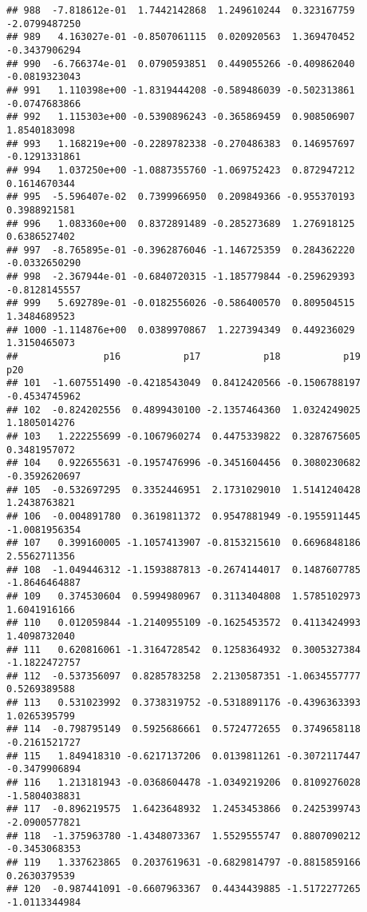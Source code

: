 \documentclass[
]{article}
\begin{document}
\begin{verbatim}
## 988  -7.818612e-01  1.7442142868  1.249610244  0.323167759 -2.0799487250
## 989   4.163027e-01 -0.8507061115  0.020920563  1.369470452 -0.3437906294
## 990  -6.766374e-01  0.0790593851  0.449055266 -0.409862040 -0.0819323043
## 991   1.110398e+00 -1.8319444208 -0.589486039 -0.502313861 -0.0747683866
## 992   1.115303e+00 -0.5390896243 -0.365869459  0.908506907  1.8540183098
## 993   1.168219e+00 -0.2289782338 -0.270486383  0.146957697 -0.1291331861
## 994   1.037250e+00 -1.0887355760 -1.069752423  0.872947212  0.1614670344
## 995  -5.596407e-02  0.7399966950  0.209849366 -0.955370193  0.3988921581
## 996   1.083360e+00  0.8372891489 -0.285273689  1.276918125  0.6386527402
## 997  -8.765895e-01 -0.3962876046 -1.146725359  0.284362220 -0.0332650290
## 998  -2.367944e-01 -0.6840720315 -1.185779844 -0.259629393 -0.8128145557
## 999   5.692789e-01 -0.0182556026 -0.586400570  0.809504515  1.3484689523
## 1000 -1.114876e+00  0.0389970867  1.227394349  0.449236029  1.3150465073
##               p16           p17           p18           p19           p20
## 101  -1.607551490 -0.4218543049  0.8412420566 -0.1506788197 -0.4534745962
## 102  -0.824202556  0.4899430100 -2.1357464360  1.0324249025  1.1805014276
## 103   1.222255699 -0.1067960274  0.4475339822  0.3287675605  0.3481957072
## 104   0.922655631 -0.1957476996 -0.3451604456  0.3080230682 -0.3592620697
## 105  -0.532697295  0.3352446951  2.1731029010  1.5141240428  1.2438763821
## 106  -0.004891780  0.3619811372  0.9547881949 -0.1955911445 -1.0081956354
## 107   0.399160005 -1.1057413907 -0.8153215610  0.6696848186  2.5562711356
## 108  -1.049446312 -1.1593887813 -0.2674144017  0.1487607785 -1.8646464887
## 109   0.374530604  0.5994980967  0.3113404808  1.5785102973  1.6041916166
## 110   0.012059844 -1.2140955109 -0.1625453572  0.4113424993  1.4098732040
## 111   0.620816061 -1.3164728542  0.1258364932  0.3005327384 -1.1822472757
## 112  -0.537356097  0.8285783258  2.2130587351 -1.0634557777  0.5269389588
## 113   0.531023992  0.3738319752 -0.5318891176 -0.4396363393  1.0265395799
## 114  -0.798795149  0.5925686661  0.5724772655  0.3749658118 -0.2161521727
## 115   1.849418310 -0.6217137206  0.0139811261 -0.3072117447 -0.3479906894
## 116   1.213181943 -0.0368604478 -1.0349219206  0.8109276028 -1.5804038831
## 117  -0.896219575  1.6423648932  1.2453453866  0.2425399743 -2.0900577821
## 118  -1.375963780 -1.4348073367  1.5529555747  0.8807090212 -0.3453068353
## 119   1.337623865  0.2037619631 -0.6829814797 -0.8815859166  0.2630379539
## 120  -0.987441091 -0.6607963367  0.4434439885 -1.5172277265 -1.0113344984

\end{verbatim}
\end{document}
